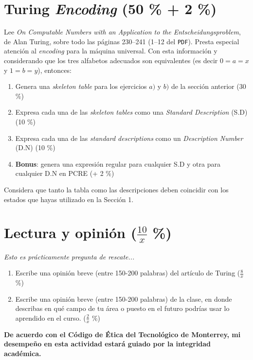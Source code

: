 \documentclass[8pt, onside]{article}
\begin{document}
\section{Turing \textit{Encoding} (50 \% + 2 \%)}

Lee \textit{On Computable Numbers with an Application to the Entscheidungsproblem}, de Alan Turing, sobre todo las páginas 230--241 (1--12 del \texttt{PDF}). Presta especial atención al \textit{encoding} para la máquina universal. Con esta información y considerando que los tres alfabetos adecuados son equivalentes (es decir $0=a=x$ y $1=b=y$), entonces:

\begin{enumerate}[label=\tt \alph*)]
    \item Genera una \textit{skeleton table} para los ejercicios $a)$ y $b)$ de la sección anterior (30 \%)
    \item Expresa cada una de las \textit{skeleton tables} como una \textit{Standard Description} (S.D) (10 \%)
    \item Expresa cada una de las \textit{standard descriptions} como un \textit{Description Number} (D.N) (10 \%)
    \item \textbf{Bonus}: genera una expresión regular para cualquier S.D y otra para cualquier D.N en PCRE (+ 2 \%)
\end{enumerate}

Considera que tanto la tabla como las descripciones deben coincidir con los estados que hayas utilizado en la Sección 1.

\section{Lectura y opinión ($\frac{10}{x}$ \%)}

{\footnotesize \it Esto es prácticamente pregunta de rescate...}

\begin{enumerate}[label=\tt \alph*)]
    \item Escribe una opinión breve (entre 150-200 palabras) del artículo de Turing ($\frac{8}{x}$ \%)
    \item Escribe una opinión breve (entre 150-200 palabras) de la clase, en donde describas en qué campo de tu área o puesto en el futuro podrías usar lo aprendido en el curso. ($\frac{2}{x}$ \%)
\end{enumerate}

\vfill

\textbf{De acuerdo con el Código de Ética del Tecnológico de Monterrey, mi desempeño en esta actividad estará guiado por la integridad académica.}
\end{document}
